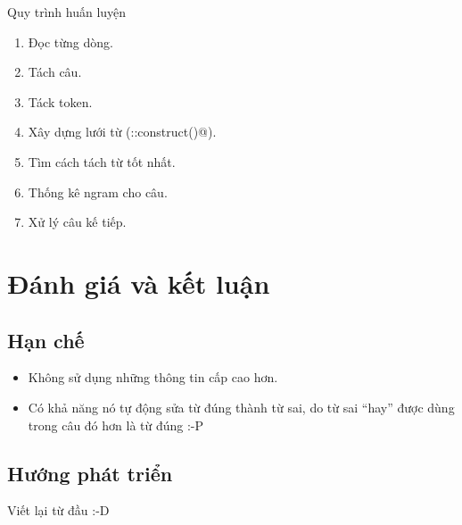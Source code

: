 \documentclass[a4paper,oneside,14pt]{extbook} %
\begin{document}
\begin{algo}
  \caption{Quy trình huấn luyện}
  \label{algo:training}
  \begin{enumerate}
  \item Đọc từng dòng.
  \item Tách câu.
  \item Táck token.
  \item Xây dựng lưới từ (\verb@Lattice::construct()@).
  \item Tìm cách tách từ tốt nhất.
  \item Thống kê ngram cho câu.
  \item Xử lý câu kế tiếp.
  \end{enumerate}
\end{algo}

\chapter{Đánh giá và kết luận}
\label{cha:conclusion}
\minitoc

\section{Hạn chế}
\begin{itemize}
\item Không sử dụng những thông tin cấp cao hơn.
\item Có khả năng nó tự động sửa từ đúng thành từ sai, do từ sai
  ``hay'' được dùng trong câu đó hơn là từ đúng :-P
\end{itemize}

\section{Hướng phát triển}
\label{sec:todo}

Viết lại từ đầu :-D
\end{document}
